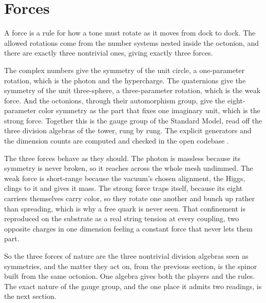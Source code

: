 \section{Forces}

A force is a rule for how a tone must rotate as it moves from dock to dock. The allowed rotations come from the number
systems nested inside the octonion, and there are exactly three nontrivial ones, giving exactly three forces.

The complex numbers give the symmetry of the unit circle, a one-parameter rotation, which is the photon and the
hypercharge. The quaternions give the symmetry of the unit three-sphere, a three-parameter rotation, which is the weak
force. And the octonions, through their automorphism group, give the eight-parameter color symmetry as the part that
fixes one imaginary unit, which is the strong force. Together this is the gauge group of the Standard Model, read off the
three division algebras of the tower, rung by rung. The explicit generators and the dimension counts are computed and
checked in the open codebase \cite{cluesurf2026repo}.

The three forces behave as they should. The photon is massless because its symmetry is never broken, so it reaches across
the whole mesh undimmed. The weak force is short-range because the vacuum's chosen alignment, the Higgs, clings to it
and gives it mass. The strong force traps itself, because its eight carriers themselves carry color, so they rotate one
another and bunch up rather than spreading, which is why a free quark is never seen. That confinement is reproduced on
the substrate as a real string tension at every coupling, two opposite charges in one dimension feeling a constant force
that never lets them part.

So the three forces of nature are the three nontrivial division algebras seen as symmetries, and the matter they act on,
from the previous section, is the spinor built from the same octonion. One algebra gives both the players and the rules.
The exact nature of the gauge group, and the one place it admits two readings, is the next section.
